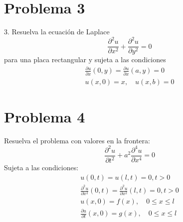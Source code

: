 \documentclass[a4paper,12pt]{article}
\begin{document}
\section{Problema 3}
3. Resuelva la ecuación de Laplace
$$
\frac{\partial^{2} u}{\partial x^{2}}+\frac{\partial^{2} u}{\partial y^{2}}=0
$$
para una placa rectangular y sujeta a las condiciones
$$
\begin{array}{c}
\frac{\partial u}{\partial x}(0, y)=\frac{\partial u}{\partial x}(a, y)=0 \\
u(x, 0)=x, \quad u(x, b)=0
\end{array}
$$
\section{Problema 4}

 Resuelva el problema con valores en la frontera:
$$
\frac{\partial^{2} u}{\partial t^{2}}+a^{2} \frac{\partial^{4} u}{\partial x^{4}}=0
$$
Sujeta a las condiciones:
$$
\begin{array}{c}
u(0, t)=u(l, t)=0, t>0 \\
\frac{\partial^{2} u}{\partial x^{2}}(0, t)=\frac{\partial^{2} u}{\partial x^{2}}(l, t)=0, t>0 \\
u(x, 0)=f(x), \quad 0 \leq x \leq l \\
\frac{\partial u}{\partial t}(x, 0)=g(x), \quad 0 \leq x \leq l
\end{array}
$$


\end{document}
